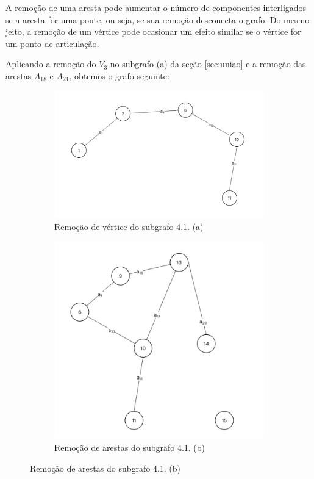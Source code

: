 	A remoção de uma aresta pode aumentar o número de componentes interligados se a aresta for uma ponte, ou seja, se sua remoção desconecta o grafo. Do mesmo jeito, a remoção de um vértice pode ocasionar um efeito similar se o vértice for um ponto de articulação.
	
	Aplicando a remoção do $V_3$ no subgrafo (a) da seção \ref{sec:uniao} e a remoção das arestas $A_{18}$ e $A_{21}$, obtemos o grafo seguinte:
	
	\begin{figure}[!h]
		\centering %
		
		\begin{subfigure}[b]{0.48\textwidth}
			\centering
			\includegraphics[width=\textwidth]{figuras/subgrafos/subgrafo_remocao_vertice.png} %
			\caption{Remoção de vértice do subgrafo 4.1. (a)}
			\label{fig:remocaoVertice}
		\end{subfigure}
		\hfill %
		\begin{subfigure}[b]{0.48\textwidth}
			\centering
			\includegraphics[width=\textwidth]{figuras/subgrafos/subgrafo_remocao_aresta.png} %
			\caption{Remoção de arestas do subgrafo 4.1. (b)}
			\label{fig:remocaoAresta}
		\end{subfigure}
		

\end{figure}
